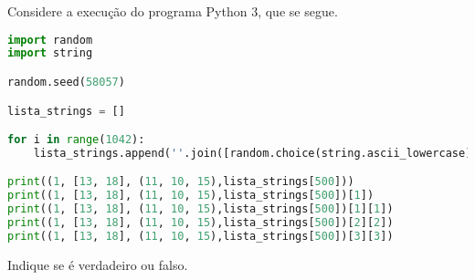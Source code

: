 \documentclass[12pt,varwidth=16cm,border=17pt]{standalone}
\begin{document}
Considere a execução do programa Python 3, que se segue. 

\begin{lstlisting}[language=Python]
import random
import string

random.seed(58057)

lista_strings = []

for i in range(1042):
	lista_strings.append(''.join([random.choice(string.ascii_lowercase) for i in range(6)]))

print((1, [13, 18], (11, 10, 15),lista_strings[500]))
print((1, [13, 18], (11, 10, 15),lista_strings[500])[1])
print((1, [13, 18], (11, 10, 15),lista_strings[500])[1][1])
print((1, [13, 18], (11, 10, 15),lista_strings[500])[2][2])
print((1, [13, 18], (11, 10, 15),lista_strings[500])[3][3])
\end{lstlisting}

Indique se é verdadeiro ou falso.
\end{document}
